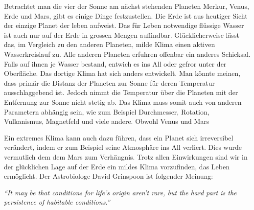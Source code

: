 \begin{refsection}

Betrachtet man die vier der Sonne am nächst stehenden Planeten Merkur, Venus, Erde und Mars, gibt es einige Dinge festzustellen.
Die Erde ist aus heutiger Sicht der einzige Planet der leben aufweist. Das für Leben notwendige flüssige Wasser ist auch nur auf der Erde in grossen Mengen auffindbar. Glücklicherweise lässt das, im Vergleich zu den anderen Planeten, milde Klima einen aktiven Wasserkreislauf zu. Alle anderen Planeten erfuhren offenbar ein anderes Schicksal. Falls auf ihnen je Wasser bestand, entwich es ins All oder gefror unter der Oberfläche. Das dortige Klima hat sich anders entwickelt.
Man könnte meinen, dass primär die Distanz der Planeten zur Sonne für deren Temperatur ausschlaggebend ist. Jedoch nimmt die Temperatur über die Planeten mit der Entfernung zur Sonne nicht stetig ab. Das Klima muss somit auch von anderen Parametern abhängig sein, wie zum Beispiel Durchmesser, Rotation, Vulkanismus, Magnetfeld und viele andere. Obwohl Venus und Mars 


Ein extremes Klima kann auch dazu führen, dass ein Planet sich irreversibel verändert, indem er zum Beispiel seine Atmosphäre ins All verliert. Dies wurde vermutlich dem dem Mars zum Verhängnis. Trotz allen Einwirkungen sind wir in der glücklichen Lage auf der Erde ein mildes Klima vorzufinden, das Leben ermöglicht. 
Der Astrobiologe David Grinspoon ist folgender Meinung:

\vspace{5pt}
\textit{“It may be that conditions for life’s origin aren’t rare, but the hard part is the persistence of habitable conditions.”} \\
\vspace{5pt}


\end{refsection}
